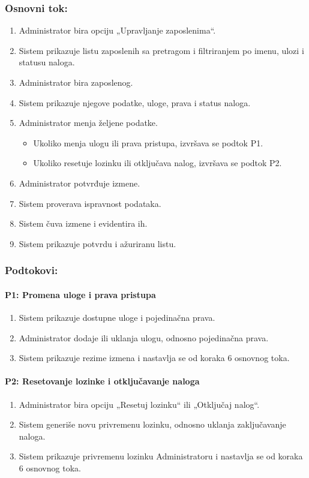 \subsubsection*{Osnovni tok:}
\begin{enumerate}
	\item Administrator bira opciju „Upravljanje zaposlenima“.
	\item Sistem prikazuje listu zaposlenih sa pretragom i filtriranjem po imenu, ulozi i statusu naloga.
	\item Administrator bira zaposlenog.
	\item Sistem prikazuje njegove podatke, uloge, prava i status naloga.
	\item Administrator menja željene podatke.
	\begin{itemize}
		\item Ukoliko menja ulogu ili prava pristupa, izvršava se podtok P1.
		\item Ukoliko resetuje lozinku ili otključava nalog, izvršava se podtok P2.
	\end{itemize}
	\item Administrator potvrđuje izmene.
	\item Sistem proverava ispravnost podataka.
	\item Sistem čuva izmene i evidentira ih.
	\item Sistem prikazuje potvrdu i ažuriranu listu.
\end{enumerate}

\subsubsection*{Podtokovi:}

\paragraph*{P1: Promena uloge i prava pristupa}
\begin{enumerate}
	\item Sistem prikazuje dostupne uloge i pojedinačna prava.
	\item Administrator dodaje ili uklanja ulogu, odnosno pojedinačna prava.
	\item Sistem prikazuje rezime izmena i nastavlja se od koraka 6 osnovnog toka.
\end{enumerate}

\paragraph*{P2: Resetovanje lozinke i otključavanje naloga}
\begin{enumerate}
	\item Administrator bira opciju „Resetuj lozinku“ ili „Otključaj nalog“.
	\item Sistem generiše novu privremenu lozinku, odnosno uklanja zaključavanje naloga.
	\item Sistem prikazuje privremenu lozinku Administratoru i nastavlja se od koraka 6 osnovnog toka.
\end{enumerate}

